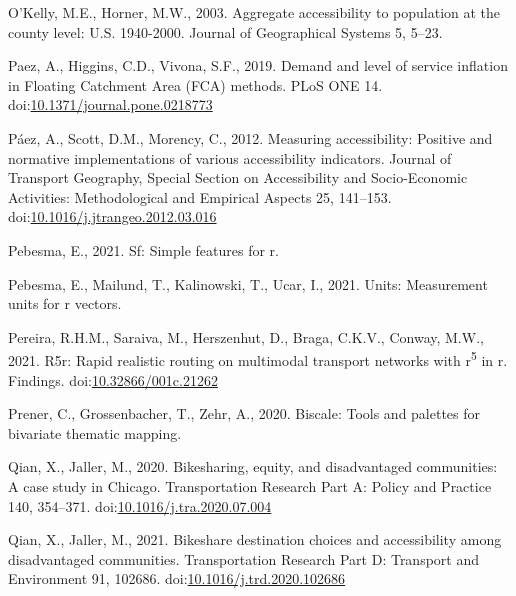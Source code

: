 \documentclass[]{elsarticle} %
\begin{document}
\leavevmode\hypertarget{ref-okelly2003aggregate}{}%
O'Kelly, M.E., Horner, M.W., 2003. Aggregate accessibility to population
at the county level: U.S. 1940-2000. Journal of Geographical Systems 5,
5--23.

\leavevmode\hypertarget{ref-paezDemandLevelService2019}{}%
Paez, A., Higgins, C.D., Vivona, S.F., 2019. Demand and level of service
inflation in Floating Catchment Area (FCA) methods. PLoS ONE 14.
doi:\href{https://doi.org/10.1371/journal.pone.0218773}{10.1371/journal.pone.0218773}

\leavevmode\hypertarget{ref-paezMeasuringAccessibilityPositive2012}{}%
Páez, A., Scott, D.M., Morency, C., 2012. Measuring accessibility:
Positive and normative implementations of various accessibility
indicators. Journal of Transport Geography, Special Section on
Accessibility and Socio-Economic Activities: Methodological and
Empirical Aspects 25, 141--153.
doi:\href{https://doi.org/10.1016/j.jtrangeo.2012.03.016}{10.1016/j.jtrangeo.2012.03.016}

\leavevmode\hypertarget{ref-R-sf}{}%
Pebesma, E., 2021. Sf: Simple features for r.

\leavevmode\hypertarget{ref-R-units}{}%
Pebesma, E., Mailund, T., Kalinowski, T., Ucar, I., 2021. Units:
Measurement units for r vectors.

\leavevmode\hypertarget{ref-Pereira2021r5r}{}%
Pereira, R.H.M., Saraiva, M., Herszenhut, D., Braga, C.K.V., Conway,
M.W., 2021. R5r: Rapid realistic routing on multimodal transport
networks with r\textsuperscript{5} in r. Findings.
doi:\href{https://doi.org/10.32866/001c.21262}{10.32866/001c.21262}

\leavevmode\hypertarget{ref-R-biscale}{}%
Prener, C., Grossenbacher, T., Zehr, A., 2020. Biscale: Tools and
palettes for bivariate thematic mapping.

\leavevmode\hypertarget{ref-qianBikesharingEquityDisadvantaged2020}{}%
Qian, X., Jaller, M., 2020. Bikesharing, equity, and disadvantaged
communities: A case study in Chicago. Transportation Research Part A:
Policy and Practice 140, 354--371.
doi:\href{https://doi.org/10.1016/j.tra.2020.07.004}{10.1016/j.tra.2020.07.004}

\leavevmode\hypertarget{ref-qianBikeshareDestinationChoices2021}{}%
Qian, X., Jaller, M., 2021. Bikeshare destination choices and
accessibility among disadvantaged communities. Transportation Research
Part D: Transport and Environment 91, 102686.
doi:\href{https://doi.org/10.1016/j.trd.2020.102686}{10.1016/j.trd.2020.102686}
\end{document}
